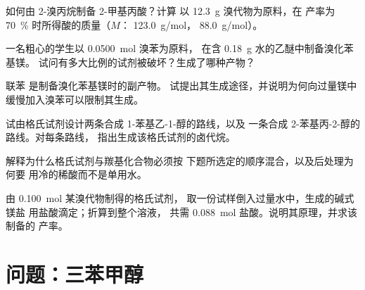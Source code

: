 \begin{exercise}[$\star\star$]\label{exo:b1:organomagnesium:7}
如何由 2-溴丙烷制备 2-甲基丙酸？计算
以 \qty{12.3}{g} 溴代物为原料，在
产率为 \qty{70}{\percent} 时所得酸的质量（$M$： \qty{123.0}{g/mol}，
\qty{88.0}{g/mol}）。
\end{exercise}

\begin{exercise}[$\star\star$]\label{exo:b1:organomagnesium:8}
一名粗心的学生以 \qty{0.0500}{mol} 溴苯为原料，
在含 \qty{0.18}{g} 水的乙醚中制备溴化苯基镁。
试问有多大比例的试剂被破坏？生成了哪种产物？
\end{exercise}

\begin{exercise}[$\star\star$]\label{exo:b1:organomagnesium:9}
联苯  是制备溴化苯基镁时的副产物。
试提出其生成途径，并说明为何向过量镁中
缓慢加入溴苯可以限制其生成。
\end{exercise}

\begin{exercise}[$\star\star\star$]\label{exo:b1:organomagnesium:10}
试由格氏试剂设计两条合成 1-苯基乙-1-醇的路线，以及
一条合成 2-苯基丙-2-醇的路线。对每条路线，
指出生成该格氏试剂的卤代烷。
\end{exercise}

\begin{exercise}[$\star\star\star$]\label{exo:b1:organomagnesium:11}
解释为什么格氏试剂与羰基化合物必须按
下题所选定的顺序混合，以及后处理为何要
用冷的稀酸而不是单用水。
\end{exercise}

\begin{exercise}[$\star\star\star$]\label{exo:b1:organomagnesium:12}
由 \qty{0.100}{mol} 某溴代物制得的格氏试剂，
取一份试样倒入过量水中，生成的碱式镁盐
用盐酸滴定；折算到整个溶液，
共需 \qty{0.088}{mol} 盐酸。说明其原理，并求该制备的
产率。
\end{exercise}

\section{问题：三苯甲醇}

